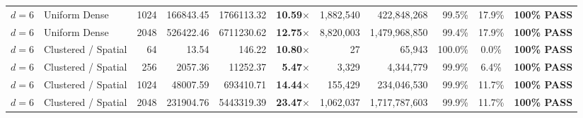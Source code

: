 \begin{table}[t]
\begin{tabular}{llr rrrrr rcc}
$d = 6$ & Uniform Dense & 1024 & 166843.45 & 1766113.32 & \textbf{10.59$\times$} & 1,882,540 & 422,848,268 & 99.5\% & 17.9\% & \textbf{100\% PASS} \\
$d = 6$ & Uniform Dense & 2048 & 526422.46 & 6711230.62 & \textbf{12.75$\times$} & 8,820,003 & 1,479,968,850 & 99.4\% & 17.9\% & \textbf{100\% PASS} \\
$d = 6$ & Clustered / Spatial & 64 & 13.54 & 146.22 & \textbf{10.80$\times$} & 27 & 65,943 & 100.0\% & 0.0\% & \textbf{100\% PASS} \\
$d = 6$ & Clustered / Spatial & 256 & 2057.36 & 11252.37 & \textbf{5.47$\times$} & 3,329 & 4,344,779 & 99.9\% & 6.4\% & \textbf{100\% PASS} \\
$d = 6$ & Clustered / Spatial & 1024 & 48007.59 & 693410.71 & \textbf{14.44$\times$} & 155,429 & 234,046,530 & 99.9\% & 11.7\% & \textbf{100\% PASS} \\
$d = 6$ & Clustered / Spatial & 2048 & 231904.76 & 5443319.39 & \textbf{23.47$\times$} & 1,062,037 & 1,717,787,603 & 99.9\% & 11.7\% & \textbf{100\% PASS} \\
\bottomrule
\end{tabular}
\end{table}